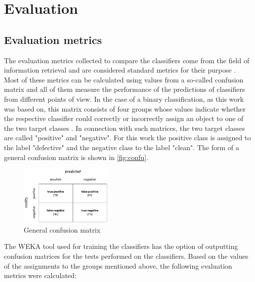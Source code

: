 
\section{Evaluation}

\subsection{Evaluation metrics}

The evaluation metrics collected to compare the classifiers come from the field of information retrieval and are considered standard metrics for their purpose \cite{Sammut2017}. Most of these metrics can be calculated using values from a so-called confusion matrix and all of them measure the performance of the predictions of classifiers from different points of view. In the case of a binary classification, as this work was based on, this matrix consists of four groups whose values indicate whether the respective classifier could correctly or incorrectly assign an object to one of the two target classes \cite{Sammut2017}. In connection with such matrices, the two target classes are called "positive" and "negative". For this work the positive class is assigned to the label "defective" and the negative class to the label "clean". The form of a general confusion matrix is shown in \autoref{fig:confu}.

\begin{figure}[H]
    \centering
    \includegraphics[width=0.4\textwidth]{images/Confusion}
    \caption{General confusion matrix\label{fig:confu}}
\end{figure}

The WEKA tool used for training the classifiers has the option of outputting confusion matrices for the tests performed on the classifiers. Based on the values of the assignments to the groups mentioned above, the following evaluation metrics were calculated:

